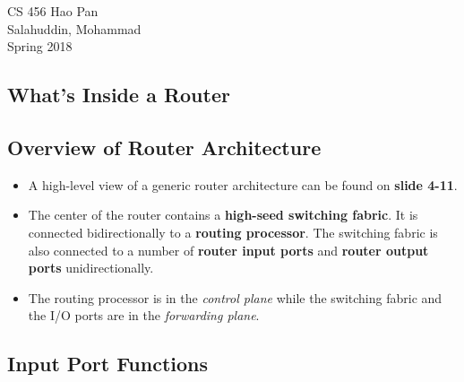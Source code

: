 \documentclass{article}
\begin{document}
\noindent
{CS 456 \hfill Hao Pan}\\
{Salahuddin, Mohammad}\\
{Spring 2018}


\begin{center}
\section{What's Inside a Router}
\noindent
\end{center}

\subsection{Overview of Router Architecture}

\begin{itemize}
\item A high-level view of a generic router architecture can be found on {\bf slide 4-11}.
\item The center of the router contains a {\bf high-seed switching fabric}. It is connected bidirectionally to a {\bf routing processor}. The switching fabric is also connected to a number of {\bf router input ports} and {\bf router output ports} unidirectionally.
\item The routing processor is in the \emph{control plane} while the switching fabric and the I/O ports are in the \emph{forwarding plane}.
\end{itemize}

\subsection{Input Port Functions}
\end{document}
